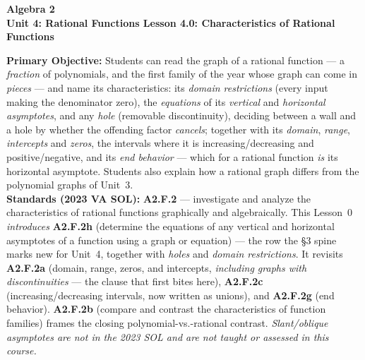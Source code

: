 \documentclass[10pt]{article}
\newcommand{\CourseName}{Algebra 2}
\newcommand{\UnitNumberName}{Unit 4: Rational Functions \quad}
\newcommand{\LessonNumberName}{Lesson 4.0: Characteristics of Rational Functions}
\begin{document}
\begin{center}
    {\Large\bfseries \CourseName \\
    {\small\bfseries \UnitNumberName \LessonNumberName}}
\end{center}

\begin{tcolorbox}[colback=forestbg, colframe=forest, boxrule=0.9pt, arc=2mm,
    left=2mm, right=2mm, top=1.5mm, bottom=1.5mm]
    \textbf{Primary Objective:} Students can read the graph of a rational function --- a
    \emph{fraction} of polynomials, and the first family of the year whose graph can come in
    \emph{pieces} --- and name its characteristics: its \emph{domain restrictions} (every input making
    the denominator zero), the \emph{equations} of its \emph{vertical} and \emph{horizontal
    asymptotes}, and any \emph{hole} (removable discontinuity), deciding between a wall and a hole by
    whether the offending factor \emph{cancels}; together with its \emph{domain}, \emph{range},
    \emph{intercepts} and \emph{zeros}, the intervals where it is increasing/decreasing and
    positive/negative, and its \emph{end behavior} --- which for a rational function \emph{is} its
    horizontal asymptote. Students also explain how a rational graph differs from the polynomial graphs
    of Unit~3.
    \\[2pt]
    \textbf{Standards (2023 VA SOL):} \textbf{A2.F.2} --- investigate and analyze the characteristics
    of rational functions graphically and algebraically. This Lesson~0 \emph{introduces}
    \textbf{A2.F.2h} (determine the equations of any vertical and horizontal asymptotes of a function
    using a graph or equation) --- the row the \S3 spine marks new for Unit~4, together with
    \emph{holes} and \emph{domain restrictions}. It revisits \textbf{A2.F.2a} (domain, range, zeros,
    and intercepts, \emph{including graphs with discontinuities} --- the clause that first bites here),
    \textbf{A2.F.2c} (increasing/decreasing intervals, now written as unions), and \textbf{A2.F.2g}
    (end behavior). \textbf{A2.F.2b} (compare and contrast the characteristics of function families)
    frames the closing polynomial-vs.-rational contrast. \emph{Slant/oblique asymptotes are not in the
    2023 SOL and are not taught or assessed in this course.}
\end{tcolorbox}
\end{document}
